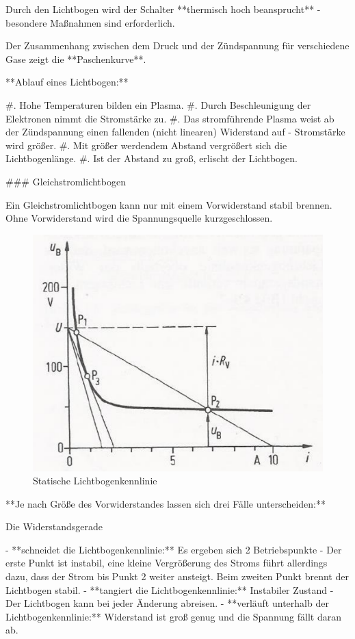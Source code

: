 \begin{markdown}
Durch den Lichtbogen wird der Schalter **thermisch hoch beansprucht** - besondere Maßnahmen sind erforderlich. 

Der Zusammenhang zwischen dem Druck und der Zündspannung für verschiedene Gase zeigt die **Paschenkurve**.

**Ablauf eines Lichtbogen:**

#. Hohe Temperaturen bilden ein Plasma.
#. Durch Beschleunigung der Elektronen nimmt die Stromstärke zu.
#. Das stromführende Plasma weist ab der Zündspannung einen fallenden (nicht linearen) Widerstand auf - Stromstärke wird größer.
#. Mit größer werdendem Abstand vergrößert sich die Lichtbogenlänge.
#. Ist der Abstand zu groß, erlischt der Lichtbogen.

### Gleichstromlichtbogen

Ein Gleichstromlichtbogen kann nur mit einem Vorwiderstand stabil brennen. Ohne Vorwiderstand wird die Spannungsquelle kurzgeschlossen.

\begin{figure}
    \centering
    \includegraphics[width=\linewidth]{./images/10-Schaltanlagen/Lichtbogenkennlinie-Statisch.png}
    \caption[Statische Lichtbogenkennlinie]{Statische Lichtbogenkennlinie}
\end{figure}

**Je nach Größe des Vorwiderstandes lassen sich drei Fälle unterscheiden:**

Die Widerstandsgerade

- **schneidet die Lichtbogenkennlinie:** Es ergeben sich 2 Betriebspunkte - Der erste Punkt ist instabil, eine kleine Vergrößerung des Stroms führt allerdings dazu, dass der Strom bis Punkt 2 weiter ansteigt. Beim zweiten Punkt brennt der Lichtbogen stabil.  
- **tangiert die Lichtbogenkennlinie:** Instabiler Zustand - Der Lichtbogen kann bei jeder Änderung abreisen.
- **verläuft unterhalb der Lichtbogenkennlinie:** Widerstand ist groß genug und die Spannung fällt daran ab.


\end{markdown}
